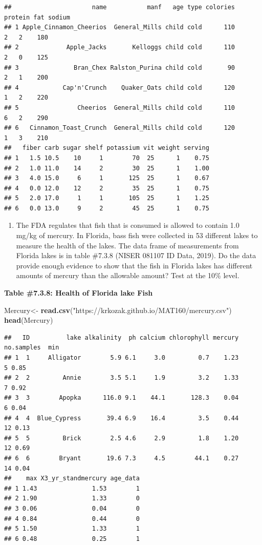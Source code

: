 \documentclass[
]{book}
\newenvironment{Shaded}{\begin{snugshade}}{\end{snugshade}}
\newcommand{\KeywordTok}[1]{\textcolor[rgb]{0.13,0.29,0.53}{\textbf{#1}}}
\newcommand{\NormalTok}[1]{#1}
\newcommand{\StringTok}[1]{\textcolor[rgb]{0.31,0.60,0.02}{#1}}
\providecommand{\tightlist}{%
  \setlength{\itemsep}{0pt}\setlength{\parskip}{0pt}}
\begin{document}
\begin{verbatim}
##                      name           manf   age type colories protein fat sodium
## 1 Apple_Cinnamon_Cheerios  General_Mills child cold      110       2   2    180
## 2             Apple_Jacks       Kelloggs child cold      110       2   0    125
## 3               Bran_Chex Ralston_Purina child cold       90       2   1    200
## 4            Cap'n'Crunch    Quaker_Oats child cold      120       1   2    220
## 5                Cheerios  General_Mills child cold      110       6   2    290
## 6   Cinnamon_Toast_Crunch  General_Mills child cold      120       1   3    210
##   fiber carb sugar shelf potassium vit weight serving
## 1   1.5 10.5    10     1        70  25      1    0.75
## 2   1.0 11.0    14     2        30  25      1    1.00
## 3   4.0 15.0     6     1       125  25      1    0.67
## 4   0.0 12.0    12     2        35  25      1    0.75
## 5   2.0 17.0     1     1       105  25      1    1.25
## 6   0.0 13.0     9     2        45  25      1    0.75
\end{verbatim}

\begin{enumerate}
\def\labelenumi{\arabic{enumi}.}
\setcounter{enumi}{2}
\tightlist
\item
  The FDA regulates that fish that is consumed is allowed to contain 1.0 mg/kg of mercury. In Florida, bass fish were collected in 53 different lakes to measure the health of the lakes. The data frame of measurements from Florida lakes is in table \#7.3.8 (NISER 081107 ID Data, 2019). Do the data provide enough evidence to show that the fish in Florida lakes has different amounts of mercury than the allowable amount? Test at the 10\% level.
\end{enumerate}

\textbf{Table \#7.3.8: Health of Florida lake Fish}

\begin{Shaded}
\begin{Highlighting}[]
\NormalTok{Mercury<-}\StringTok{ }\KeywordTok{read.csv}\NormalTok{(}\StringTok{"https://krkozak.github.io/MAT160/mercury.csv"}\NormalTok{)}
\KeywordTok{head}\NormalTok{(Mercury)}
\end{Highlighting}
\end{Shaded}

\begin{verbatim}
##   ID          lake alkalinity  ph calcium chlorophyll mercury no.samples  min
## 1  1     Alligator        5.9 6.1     3.0         0.7    1.23          5 0.85
## 2  2         Annie        3.5 5.1     1.9         3.2    1.33          7 0.92
## 3  3        Apopka      116.0 9.1    44.1       128.3    0.04          6 0.04
## 4  4  Blue_Cypress       39.4 6.9    16.4         3.5    0.44         12 0.13
## 5  5         Brick        2.5 4.6     2.9         1.8    1.20         12 0.69
## 6  6        Bryant       19.6 7.3     4.5        44.1    0.27         14 0.04
##    max X3_yr_standmercury age_data
## 1 1.43               1.53        1
## 2 1.90               1.33        0
## 3 0.06               0.04        0
## 4 0.84               0.44        0
## 5 1.50               1.33        1
## 6 0.48               0.25        1
\end{verbatim}
\end{document}
